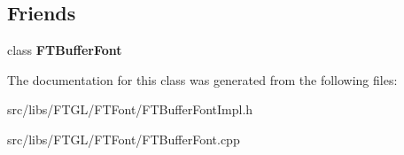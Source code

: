 \subsection*{Friends}
\begin{DoxyCompactItemize}
\item 
\hypertarget{class_f_t_buffer_font_impl_ab7dc21f40be33fee50c41b3ba3d49c73}{
class {\bfseries FTBufferFont}}
\label{class_f_t_buffer_font_impl_ab7dc21f40be33fee50c41b3ba3d49c73}

\end{DoxyCompactItemize}


The documentation for this class was generated from the following files:\begin{DoxyCompactItemize}
\item 
src/libs/FTGL/FTFont/FTBufferFontImpl.h\item 
src/libs/FTGL/FTFont/FTBufferFont.cpp\end{DoxyCompactItemize}
